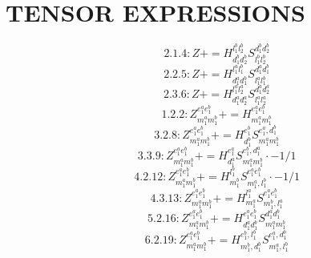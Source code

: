 \documentclass[letterpaper,10pt,fleqn,leqno,onecolumn]{article}
\begin{document}
\section{TENSOR EXPRESSIONS}
\begin{equation} \;\;\;\;\;\;  2.1.4: Z+=H^{l_{1}^{b}l_{2}^{b}}_{d_{1}^{b}d_{2}^{b}}S^{d_{1}^{b}d_{2}^{b}}_{l_{1}^{b}l_{2}^{b}} \end{equation}
\begin{equation} \;\;\;\;\;\;  2.2.5: Z+=H^{l_{1}^{a}l_{1}^{b}}_{d_{1}^{a}d_{1}^{b}}S^{d_{1}^{a}d_{1}^{b}}_{l_{1}^{a}l_{1}^{b}} \end{equation}
\begin{equation} \;\;\;\;\;\;  2.3.6: Z+=H^{l_{1}^{a}l_{2}^{a}}_{d_{1}^{a}d_{2}^{a}}S^{d_{1}^{a}d_{2}^{a}}_{l_{1}^{a}l_{2}^{a}} \end{equation}
\begin{equation} \;\;\;\;\;\;  1.2.2: Z^{e_{1}^{a}e_{1}^{b}}_{m_{1}^{a}m_{1}^{b}}+=H^{e_{1}^{a}e_{1}^{b}}_{m_{1}^{a}m_{1}^{b}} \end{equation}
\begin{equation} \;\;\;\;\;\;  3.2.8: Z^{e_{1}^{a}e_{1}^{b}}_{m_{1}^{a}m_{1}^{b}}+=H^{e_{1}^{b}}_{d_{1}^{b}}S^{e_{1}^{a},d_{1}^{b}}_{m_{1}^{a}m_{1}^{b}} \end{equation}
\begin{equation} \;\;\;\;\;\;  3.3.9: Z^{e_{1}^{a}e_{1}^{b}}_{m_{1}^{a}m_{1}^{b}}+=H^{e_{1}^{a}}_{d_{1}^{a}}S^{e_{1}^{b},d_{1}^{a}}_{m_{1}^{a}m_{1}^{b}}\cdot -1/1 \end{equation}
\begin{equation} \;\;\;\;\;\;  4.2.12: Z^{e_{1}^{a}e_{1}^{b}}_{m_{1}^{a}m_{1}^{b}}+=H^{l_{1}^{b}}_{m_{1}^{b}}S^{e_{1}^{a}e_{1}^{b}}_{m_{1}^{a},l_{1}^{b}}\cdot -1/1 \end{equation}
\begin{equation} \;\;\;\;\;\;  4.3.13: Z^{e_{1}^{a}e_{1}^{b}}_{m_{1}^{a}m_{1}^{b}}+=H^{l_{1}^{a}}_{m_{1}^{a}}S^{e_{1}^{a}e_{1}^{b}}_{m_{1}^{b},l_{1}^{a}} \end{equation}
\begin{equation} \;\;\;\;\;\;  5.2.16: Z^{e_{1}^{a}e_{1}^{b}}_{m_{1}^{a}m_{1}^{b}}+=H^{e_{1}^{a}e_{1}^{b}}_{d_{1}^{a}d_{1}^{b}}S^{d_{1}^{a}d_{1}^{b}}_{m_{1}^{a}m_{1}^{b}} \end{equation}
\begin{equation} \;\;\;\;\;\;  6.2.19: Z^{e_{1}^{a}e_{1}^{b}}_{m_{1}^{a}m_{1}^{b}}+=H^{e_{1}^{b},l_{1}^{b}}_{m_{1}^{b},d_{1}^{b}}S^{e_{1}^{a},d_{1}^{b}}_{m_{1}^{a},l_{1}^{b}} \end{equation}
\end{document}

